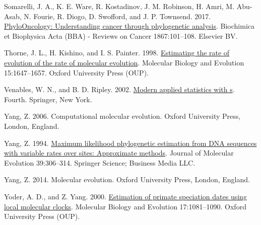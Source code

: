 \documentclass[fleqn,10pt,lineno]{wlpeerj} %
\newlength{\cslhangindent}
\newenvironment{CSLReferences}[2] %
 {\begin{list}{}{%
  \setlength{\itemindent}{0pt}
  \setlength{\leftmargin}{0pt}
  \setlength{\parsep}{0pt}
  \ifodd #1
   \setlength{\leftmargin}{\cslhangindent}
   \setlength{\itemindent}{-1\cslhangindent}
  \fi
  \setlength{\itemsep}{#2\baselineskip}}}
 {\end{list}}
\begin{document}
\begin{CSLReferences}{1}{0}
Somarelli, J. A., K. E. Ware, R. Kostadinov, J. M. Robinson, H. Amri, M. Abu-Asab, N. Fourie, R. Diogo, D. Swofford, and J. P. Townsend. 2017. \href{https://doi.org/10.1016/j.bbcan.2016.10.006}{PhyloOncology: Understanding cancer through phylogenetic analysis}. Biochimica et Biophysica Acta (BBA) - Reviews on Cancer 1867:101--108. Elsevier BV.

Thorne, J. L., H. Kishino, and I. S. Painter. 1998. \href{https://doi.org/10.1093/oxfordjournals.molbev.a025892}{Estimating the rate of evolution of the rate of molecular evolution}. Molecular Biology and Evolution 15:1647--1657. Oxford University Press (OUP).

Venables, W. N., and B. D. Ripley. 2002. \href{https://www.stats.ox.ac.uk/pub/MASS4/}{Modern applied statistics with s}. Fourth. Springer, New York.

Yang, Z. 2006. Computational molecular evolution. Oxford University Press, London, England.

Yang, Z. 1994. \href{https://doi.org/10.1007/bf00160154}{Maximum likelihood phylogenetic estimation from DNA sequences with variable rates over sites: Approximate methods}. Journal of Molecular Evolution 39:306--314. Springer Science; Business Media LLC.

Yang, Z. 2014. Molecular evolution. Oxford University Press, London, England.

Yoder, A. D., and Z. Yang. 2000. \href{https://doi.org/10.1093/oxfordjournals.molbev.a026389}{Estimation of primate speciation dates using local molecular clocks}. Molecular Biology and Evolution 17:1081--1090. Oxford University Press (OUP).

\end{CSLReferences}
\end{document}
